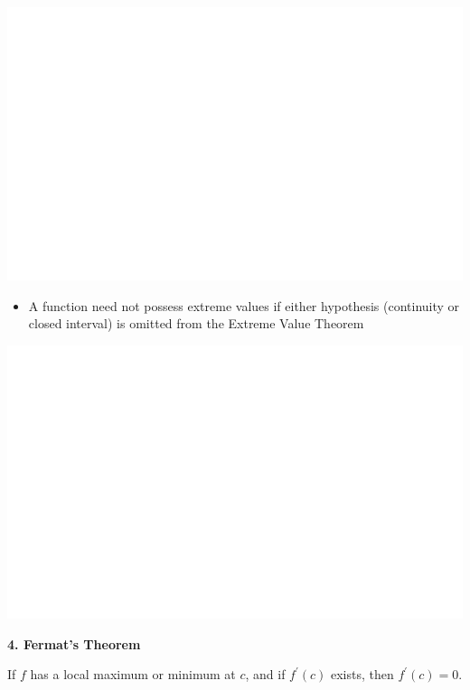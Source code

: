 \documentclass[]{book}
\providecommand{\tightlist}{%
  \setlength{\itemsep}{0pt}\setlength{\parskip}{0pt}}
\begin{document}
\begin{center}\includegraphics[width=1\linewidth]{figure/LB30-1} \end{center}

\begin{itemize}
\tightlist
\item
  A function need not possess extreme values if either hypothesis (continuity or closed interval) is omitted from the Extreme Value Theorem
\end{itemize}

\begin{center}\includegraphics[width=1\linewidth]{figure/LB31-1} \end{center}

\textbf{4. Fermat's Theorem}

If \(f\) has a local maximum or minimum at \(c\), and if \(f^\prime(c)\) exists, then \(f^\prime(c) = 0.\)
\end{document}
